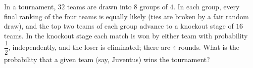 In a tournament, $32$ teams are drawn into $8$ groups of $4$. In each group, every final ranking of the four teams is equally likely (ties are broken by a fair random draw), and the top two teams of each group advance to a knockout stage of $16$ teams. In the knockout stage each match is won by either team with probability $\dfrac{1}{2}$, independently, and the loser is eliminated; there are $4$ rounds. What is the probability that a given team (say, Juventus) wins the tournament?
